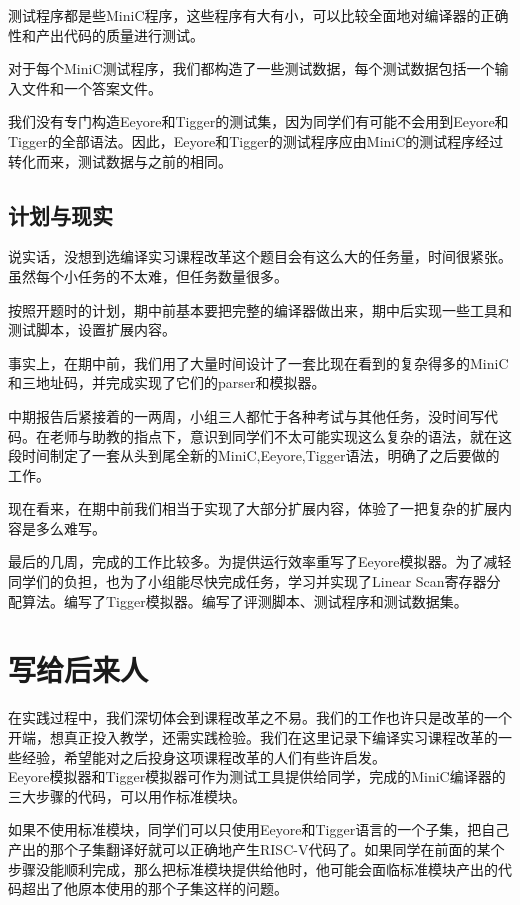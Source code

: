 \documentclass[a4paper]{ctexart}
\begin{document}
测试程序都是些MiniC程序，这些程序有大有小，可以比较全面地对编译器的正确性和产出代码的质量进行测试。

对于每个MiniC测试程序，我们都构造了一些测试数据，每个测试数据包括一个输入文件和一个答案文件。

我们没有专门构造Eeyore和Tigger的测试集，因为同学们有可能不会用到Eeyore和Tigger的全部语法。因此，Eeyore和Tigger的测试程序应由MiniC的测试程序经过转化而来，测试数据与之前的相同。

\subsection{计划与现实}

说实话，没想到选编译实习课程改革这个题目会有这么大的任务量，时间很紧张。虽然每个小任务的不太难，但任务数量很多。

按照开题时的计划，期中前基本要把完整的编译器做出来，期中后实现一些工具和测试脚本，设置扩展内容。

事实上，在期中前，我们用了大量时间设计了一套比现在看到的复杂得多的MiniC和三地址码，并完成实现了它们的parser和模拟器。

中期报告后紧接着的一两周，小组三人都忙于各种考试与其他任务，没时间写代码。在老师与助教的指点下，意识到同学们不太可能实现这么复杂的语法，就在这段时间制定了一套从头到尾全新的MiniC,Eeyore,Tigger语法，明确了之后要做的工作。

现在看来，在期中前我们相当于实现了大部分扩展内容，体验了一把复杂的扩展内容是多么难写。

最后的几周，完成的工作比较多。为提供运行效率重写了Eeyore模拟器。为了减轻同学们的负担，也为了小组能尽快完成任务，学习并实现了Linear Scan寄存器分配算法。编写了Tigger模拟器。编写了评测脚本、测试程序和测试数据集。

\newpage
\section{写给后来人}

在实践过程中，我们深切体会到课程改革之不易。我们的工作也许只是改革的一个开端，想真正投入教学，还需实践检验。我们在这里记录下编译实习课程改革的一些经验，希望能对之后投身这项课程改革的人们有些许启发。
\\

Eeyore模拟器和Tigger模拟器可作为测试工具提供给同学，完成的MiniC编译器的三大步骤的代码，可以用作标准模块。

如果不使用标准模块，同学们可以只使用Eeyore和Tigger语言的一个子集，把自己产出的那个子集翻译好就可以正确地产生RISC-V代码了。如果同学在前面的某个步骤没能顺利完成，那么把标准模块提供给他时，他可能会面临标准模块产出的代码超出了他原本使用的那个子集这样的问题。
\end{document}
